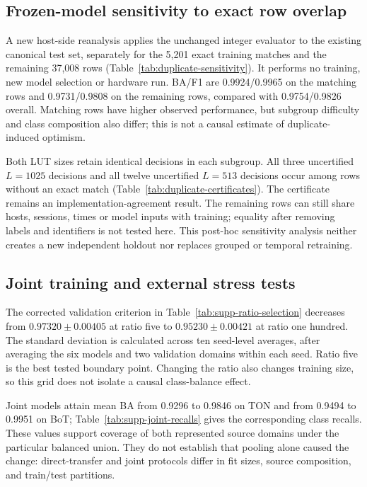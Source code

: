 \documentclass{ieeeaccess}
\begin{document}
\subsection{Frozen-model sensitivity to exact row overlap}
\label{sec:duplicate-sensitivity}
A new host-side reanalysis applies the unchanged integer evaluator to the existing canonical test set, separately for the 5,201 exact training matches and the remaining 37,008 rows (Table~\ref{tab:duplicate-sensitivity}). It performs no training, new model selection or hardware run. BA/F1 are 0.9924/0.9965 on the matching rows and 0.9731/0.9808 on the remaining rows, compared with 0.9754/0.9826 overall. Matching rows have higher observed performance, but subgroup difficulty and class composition also differ; this is not a causal estimate of duplicate-induced optimism.

Both LUT sizes retain identical decisions in each subgroup. All three uncertified $L=1025$ decisions and all twelve uncertified $L=513$ decisions occur among rows without an exact match (Table~\ref{tab:duplicate-certificates}). The certificate remains an implementation-agreement result. The remaining rows can still share hosts, sessions, times or model inputs with training; equality after removing labels and identifiers is not tested here. This post-hoc sensitivity analysis neither creates a new independent holdout nor replaces grouped or temporal retraining.






\subsection{Joint training and external stress tests}
The corrected validation criterion in Table~\ref{tab:supp-ratio-selection} decreases from $0.97320\pm0.00405$ at ratio five to $0.95230\pm0.00421$ at ratio one hundred. The standard deviation is calculated across ten seed-level averages, after averaging the six models and two validation domains within each seed. Ratio five is the best tested boundary point. Changing the ratio also changes training size, so this grid does not isolate a causal class-balance effect.

Joint models attain mean BA from 0.9296 to 0.9846 on TON and from 0.9494 to 0.9951 on BoT; Table~\ref{tab:supp-joint-recalls} gives the corresponding class recalls. These values support coverage of both represented source domains under the particular balanced union. They do not establish that pooling alone caused the change: direct-transfer and joint protocols differ in fit sizes, source composition, and train/test partitions.
\end{document}
